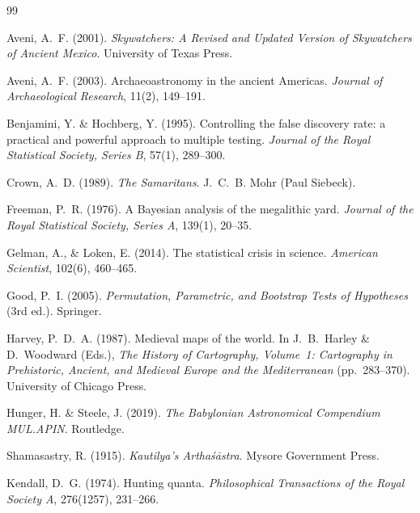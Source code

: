 \documentclass[HARVARD,twocolumn]{USG}
\begin{document}
\begin{thebibliography}{99}

Aveni, A.~F. (2001).
\textit{Skywatchers: A Revised and Updated Version of Skywatchers of
Ancient Mexico}.
University of Texas Press.

Aveni, A.~F. (2003).
Archaeoastronomy in the ancient Americas.
\textit{Journal of Archaeological Research}, 11(2), 149--191.

Benjamini, Y. \& Hochberg, Y. (1995).
Controlling the false discovery rate: a practical and powerful approach
to multiple testing.
\textit{Journal of the Royal Statistical Society, Series B}, 57(1), 289--300.

Crown, A.~D. (1989).
\textit{The Samaritans}.
J.~C.~B. Mohr (Paul Siebeck).

Freeman, P.~R. (1976).
A Bayesian analysis of the megalithic yard.
\textit{Journal of the Royal Statistical Society, Series A}, 139(1), 20--35.

Gelman, A., \& Loken, E. (2014).
The statistical crisis in science.
\textit{American Scientist}, 102(6), 460--465.

Good, P.~I. (2005).
\textit{Permutation, Parametric, and Bootstrap Tests of Hypotheses}
(3rd ed.).
Springer.

Harvey, P.~D.~A. (1987).
Medieval maps of the world.
In J.~B.~Harley \& D.~Woodward (Eds.),
\textit{The History of Cartography, Volume~1:
Cartography in Prehistoric, Ancient, and Medieval Europe
and the Mediterranean} (pp.~283--370).
University of Chicago Press.

Hunger, H. \& Steele, J. (2019).
\textit{The Babylonian Astronomical Compendium MUL.APIN}.
Routledge.

Shamasastry, R. (1915).
\textit{Kautilya's Artha\'{s}\={a}stra}.
Mysore Government Press.

Kendall, D.~G. (1974).
Hunting quanta.
\textit{Philosophical Transactions of the Royal Society A}, 276(1257), 231--266.


\end{thebibliography}
\end{document}
